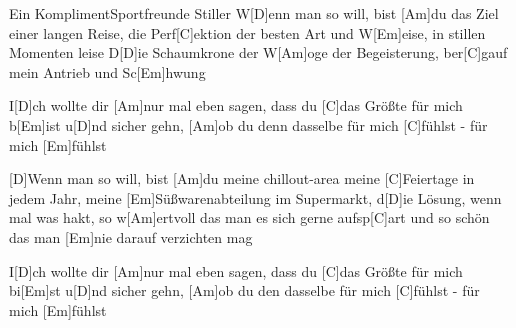 \documentclass[../main.tex]{subfiles}
\begin{document}
\begin{song}{Ein Kompliment}{Sportfreunde Stiller}{}
W[D]enn man so will, bist [Am]du das Ziel einer langen Reise,
die Perf[C]ektion der besten Art und W[Em]eise, in stillen Momenten leise
D[D]ie Schaumkrone der W[Am]oge der Begeisterung, ber[C]gauf mein Antrieb und Sc[Em]hwung
 
I[D]ch wollte dir [Am]nur mal eben sagen, dass du [C]das Größte für mich b[Em]ist
u[D]nd sicher gehn, [Am]ob du denn dasselbe für mich [C]fühlst - für mich [Em]fühlst
 
[D]Wenn man so will, bist [Am]du meine chillout-area meine [C]Feiertage in jedem Jahr,
meine [Em]Süßwarenabteilung im Supermarkt,
d[D]ie Lösung, wenn mal was hakt, so w[Am]ertvoll das man es sich gerne aufsp[C]art 
und so schön das man [Em]nie darauf verzichten mag
 
I[D]ch wollte dir [Am]nur mal eben sagen, dass du [C]das Größte für mich bi[Em]st
u[D]nd sicher gehn, [Am]ob du den dasselbe für mich [C]fühlst - für mich [Em]fühlst
\end{song}
\end{document}
